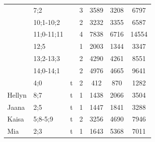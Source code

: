 \documentclass[12pt]{article}
\begin{document}
\begin{table}[H]
{\begin{tabular}{|l|l|c|c|c|c|c|}
                         & 7;2        &                           & 3                               & 3589                             & 3208                              & 6797                       \\ \cline{2-2} \cline{4-7} 
                         & 10;1-10;2  &                           & 2                               & 3232                             & 3355                              & 6587                       \\ \cline{2-2} \cline{4-7} 
                         & 11;0-11;11 &                           & 4                               & 7838                             & 6716                              & 14554                      \\ \cline{2-2} \cline{4-7} 
                         & 12;5       &                           & 1                               & 2003                             & 1344                              & 3347                       \\ \cline{2-2} \cline{4-7} 
                         & 13;2-13;3  &                           & 2                               & 4290                             & 4261                              & 8551                       \\ \cline{2-2} \cline{4-7} 
                         & 14;0-14;1  &                           & 2                               & 4976                             & 4665                              & 9641                       \\ \cline{2-7} 
                         & 4;0        & t                         & 2                               & 412                              & 870                               & 1282                       \\ \hline
Hellyn                   & 8;7        & t                         & 1                               & 1438                             & 2066                              & 3504                       \\ \hline
Jaana                    & 2;5        & t                         & 1                               & 1447                             & 1841                              & 3288                       \\ \hline
Kaisa                    & 5;8-5;9    & t                         & 2                               & 3256                             & 4690                              & 7946                       \\ \hline
Mia                      & 2;3        & t                         & 1                               & 1643                             & 5368                              & 7011                       \\ \hline

\end{tabular}}
\end{table}
\end{document}
